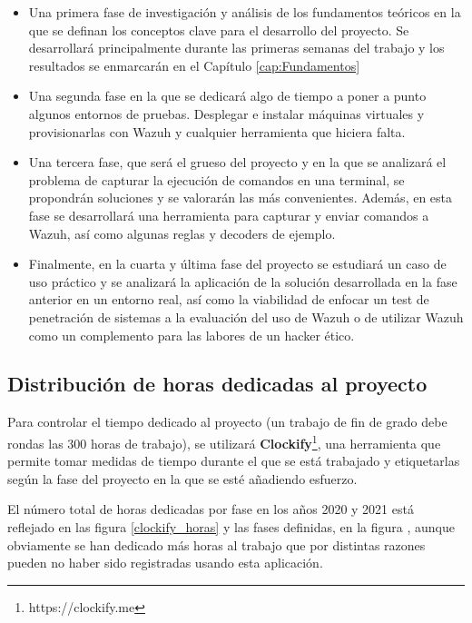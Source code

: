 \begin{itemize}
    \item Una primera fase de investigación y análisis de los fundamentos teóricos en la que se definan los conceptos clave para el desarrollo del proyecto. Se desarrollará principalmente durante las primeras semanas del trabajo y los resultados se enmarcarán en el Capítulo \ref{cap:Fundamentos}
    \item Una segunda fase en la que se dedicará algo de tiempo a poner a punto algunos entornos de pruebas. Desplegar e instalar máquinas virtuales y provisionarlas con Wazuh y cualquier herramienta que hiciera falta.
    \item Una tercera fase, que será el grueso del proyecto y en la que se analizará el problema de capturar la ejecución de comandos en una terminal, se propondrán soluciones y se valorarán las más convenientes. Además, en esta fase se desarrollará una herramienta para capturar y enviar comandos a Wazuh, así como algunas reglas y decoders de ejemplo. 
    \item Finalmente, en la cuarta y última fase del proyecto se estudiará un caso de uso práctico y se analizará la aplicación de la solución desarrollada en la fase anterior en un entorno real, así como la viabilidad de enfocar un test de penetración de sistemas a la evaluación del uso de Wazuh o de utilizar Wazuh como un complemento para las labores de un hacker ético.
\end{itemize}

\subsection{Distribución de horas dedicadas al proyecto}


Para controlar el tiempo dedicado al proyecto (un trabajo de fin de grado debe rondas las 300 horas de trabajo), se utilizará \textbf{Clockify}\footnote{https://clockify.me}, una herramienta que permite tomar medidas de tiempo durante el que se está trabajado y etiquetarlas según la fase del proyecto en la que se esté añadiendo esfuerzo.

El número total de horas dedicadas por fase en los años 2020 y 2021 está reflejado en las figura \ref{clockify_horas} y las fases definidas, en la figura \cite{clockifyfases}, aunque obviamente se han dedicado más horas al trabajo que por distintas razones pueden no haber sido registradas usando esta aplicación.%


